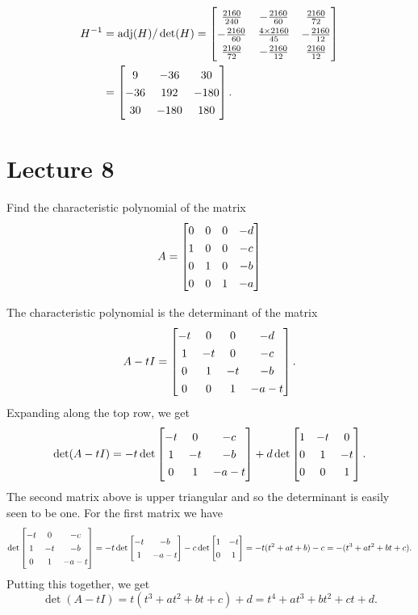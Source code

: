 \documentclass[a4paper]{amsart}
\renewenvironment{solution}{\SolutionInline}{\endSolutionInline}
\begin{document}
\begin{solution}
\begin{align*}
  H^{-1} &= \adj(H)/\det(H) 
           = \renewcommand{\arraystretch}{1.3} \bbm 
                   \frac{2160}{240} & -\frac{2160}{60} & \frac{2160}{72} \\
                  -\frac{2160}{60} &  \frac{4\tm 2160}{45} & -\frac{2160}{12} \\
                   \frac{2160}{72} & -\frac{2160}{12} &
                   \frac{2160}{12} \ebm \\
         &= \bbm   9 &  -36 &   30 \\
                 -36 &  192 & -180 \\
                  30 & -180 &  180 \ebm.
 \end{align*}
\end{solution}


\section{Lecture 8}

\begin{exercise}\label{ex-char-companion}
 Find the characteristic polynomial of the matrix
 \[ A = \bbm
     0 & 0 & 0 & -d \\
     1 & 0 & 0 & -c \\
     0 & 1 & 0 & -b \\
     0 & 0 & 1 & -a
    \ebm
 \]
\end{exercise}
\begin{solution}
 The characteristic polynomial is the determinant of the matrix
 \[ A-tI = \bbm
    -t &  0 &  0 & -d \\
     1 & -t &  0 & -c \\
     0 &  1 & -t & -b \\
     0 &  0 &  1 & -a-t
    \ebm.
 \]
 Expanding along the top row, we get
 \[ \det(A-tI) = 
    -t\det\bbm -t &  0 & -c \\
                1 & -t & -b \\
                0 &  1 & -a-t \ebm 
    +d\det\bbm  1 & -t &  0 \\
                0 &  1 & -t \\
                0 &  0 &  1 \ebm. 
 \]
 The second matrix above is upper triangular and so the determinant is
 easily seen to be one.  For the first matrix we have
 \[ \det\bbm -t &  0 & -c \\
              1 & -t & -b \\
              0 &  1 & -a-t \ebm = 
    -t \det\bbm -t & -b \\ 1 & -a-t \ebm 
    -c \det\bbm 1 & -t \\ 0 & 1 \ebm =
    -t(t^2+at+b) - c = -(t^3+at^2+bt+c).
 \]
 Putting this together, we get 
 \[ \det(A-tI) =
     t(t^3+at^2+bt+c)+d = t^4+at^3+bt^2+ct+d.
 \]
\end{solution}
\end{document}
